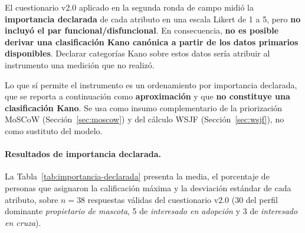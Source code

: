 \documentclass[journal,onecolumn]{IEEEtran}
\begin{document}
	El cuestionario v2.0 aplicado en la segunda ronda de campo midió la
	\textbf{importancia declarada} de cada atributo en una escala Likert de 1 a
	5, pero \textbf{no incluyó el par funcional/disfuncional}. En consecuencia,
	\textbf{no es posible derivar una clasificación Kano canónica a partir de
		los datos primarios disponibles}. Declarar categorías Kano sobre estos datos
	sería atribuir al instrumento una medición que no realizó.
	
	Lo que sí permite el instrumento es un ordenamiento por importancia
	declarada, que se reporta a continuación como \textbf{aproximación} y que
	\textbf{no constituye una clasificación Kano}. Se usa como insumo
	complementario de la priorización MoSCoW (Sección~\ref{sec:moscow}) y del
	cálculo WSJF (Sección~\ref{sec:wsjf}), no como sustituto del modelo.
	
	\paragraph{Resultados de importancia declarada.}
	La Tabla~\ref{tab:importancia-declarada} presenta la media, el porcentaje de
	personas que asignaron la calificación máxima y la desviación estándar de
	cada atributo, sobre $n = 38$ respuestas válidas del cuestionario v2.0
	(30 del perfil dominante \emph{propietario de mascota}, 5 de
	\emph{interesado en adopción} y 3 de \emph{interesado en cruza}).
	
\end{document}
